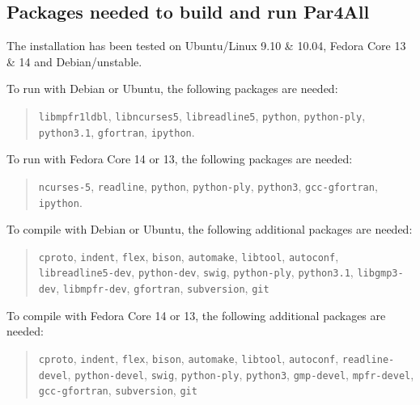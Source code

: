 \documentclass[a4paper]{article}
\begin{document}
\subsection{Packages needed to build and run Par4All}
\label{sec:pack-need-build}

The installation has been tested on Ubuntu/Linux 9.10 \& 10.04,
Fedora Core 13 \& 14 and Debian/unstable.

To run \Apfa with Debian or Ubuntu, the following packages are needed:
\begin{quote}
  \texttt{libmpfr1ldbl},
  \texttt{libncurses5}, \texttt{libreadline5}, \texttt{python},
  \texttt{python-ply}, \texttt{python3.1}, \texttt{gfortran},
  \texttt{ipython}.
\end{quote}

To run \Apfa with Fedora Core 14 or 13, the following packages are needed:
\begin{quote}
  \texttt{ncurses-5}, \texttt{readline}, \texttt{python},
  \texttt{python-ply}, \texttt{python3}, \texttt{gcc-gfortran},
  \texttt{ipython}.
\end{quote}


To compile \Apfa with Debian or Ubuntu, the following additional
packages are needed:
\begin{quote}
  \texttt{cproto}, \texttt{indent}, \texttt{flex}, \texttt{bison},
  \texttt{automake}, \texttt{libtool}, \texttt{autoconf},
  \texttt{libreadline5-dev}, \texttt{python-dev}, \texttt{swig},
  \texttt{python-ply}, \texttt{python3.1}, \texttt{libgmp3-dev},
  \texttt{libmpfr-dev}, \texttt{gfortran}, \texttt{subversion},
  \texttt{git}
\end{quote}

To compile \Apfa with Fedora Core 14 or 13, the following additional
packages are needed:
\begin{quote}
  \texttt{cproto}, \texttt{indent}, \texttt{flex}, \texttt{bison},
  \texttt{automake}, \texttt{libtool}, \texttt{autoconf},
  \texttt{readline-devel}, \texttt{python-devel}, \texttt{swig},
  \texttt{python-ply}, \texttt{python3}, \texttt{gmp-devel},
  \texttt{mpfr-devel}, \texttt{gcc-gfortran}, \texttt{subversion},
  \texttt{git}
\end{quote}

\end{document}
